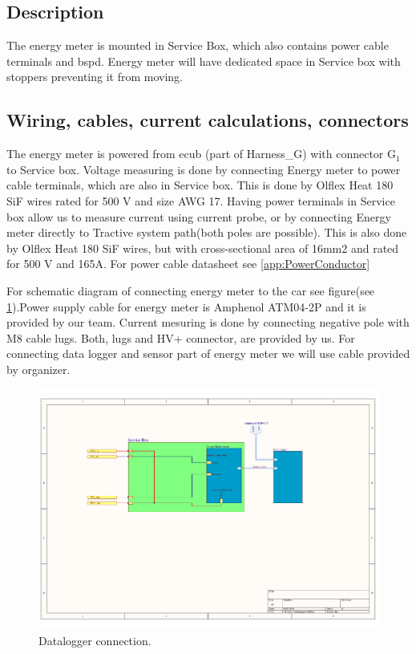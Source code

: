 \subsection{Description}

The energy meter is mounted in Service Box, which also contains power cable terminals and \gls{bspd}. Energy meter will have dedicated space in Service box with stoppers preventing it from moving. 

\subsection{Wiring, cables, current calculations, connectors}

The energy meter is powered from \gls{ecub} (part of Harness\_G) with connector G$_1$ to Service box. Voltage measuring is done by connecting Energy meter to power cable terminals, which are also in Service box. This is done by Olflex Heat 180 SiF wires rated for 500 V and size AWG 17. Having power terminals in Service box allow us to measure current using current probe, or by connecting Energy meter directly to Tractive system path(both poles are possible). This is also done by Olflex Heat 180 SiF wires, but with cross-sectional area of 16mm2 and rated for 500 V and 165A. For power cable datasheet see \ref{app:PowerConductor}

For schematic diagram of connecting energy meter to the car see figure(see \ref{fig:datalogger}).Power supply cable for energy meter is Amphenol ATM04-2P and it is provided by our team. Current mesuring is done by connecting negative pole with M8 cable lugs. Both, lugs and HV+ connector, are provided by us. For connecting data logger and sensor part of energy meter we will use cable provided by organizer.

\begin{figure}[H]
	\centering
	\includegraphics[width=\textwidth]{./img/datalogger.pdf}
	\caption{Datalogger connection.}
	\label{fig:datalogger}
\end{figure}
